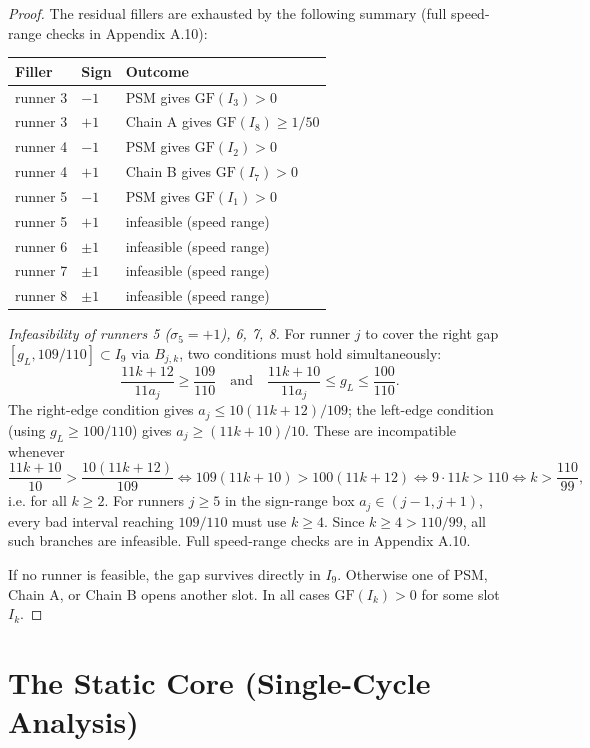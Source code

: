 \documentclass[12pt]{article}
\begin{document}
\begin{proof}
The residual fillers are exhausted by the following summary (full speed-range checks in
Appendix A.10):

\begin{center}
\begin{tabular}{@{}lll@{}}
\toprule
Filler & Sign & Outcome \\
\midrule
runner 3 & $-1$ & PSM gives $\mathrm{GF}(I_3)>0$ \\
runner 3 & $+1$ & Chain A gives $\mathrm{GF}(I_8)\ge 1/50$ \\
runner 4 & $-1$ & PSM gives $\mathrm{GF}(I_2)>0$ \\
runner 4 & $+1$ & Chain B gives $\mathrm{GF}(I_7)>0$ \\
runner 5 & $-1$ & PSM gives $\mathrm{GF}(I_1)>0$ \\
runner 5 & $+1$ & infeasible (speed range) \\
runner 6 & $\pm1$ & infeasible (speed range) \\
runner 7 & $\pm1$ & infeasible (speed range) \\
runner 8 & $\pm1$ & infeasible (speed range) \\
\bottomrule
\end{tabular}
\end{center}

\emph{Infeasibility of runners 5 ($\sigma_5=+1$), 6, 7, 8.} For runner $j$ to cover
the right gap $[g_L,109/110]\subset I_9$ via $B_{j,k}$, two conditions must hold
simultaneously:
\[
\frac{11k+12}{11a_j}\ge\frac{109}{110}\quad\text{and}\quad
  \frac{11k+10}{11a_j}\le g_L \le \frac{100}{110}.
\]
The right-edge condition gives $a_j\le 10(11k+12)/109$; the left-edge condition (using
$g_L\ge 100/110$) gives $a_j\ge(11k+10)/10$. These are incompatible whenever
\[
\frac{11k+10}{10} > \frac{10(11k+12)}{109}
  \iff 109(11k+10)>100(11k+12)
  \iff 9\cdot 11k > 110
  \iff k > \frac{110}{99},
\]
i.e. for all $k\ge 2$. For runners $j\ge 5$ in the sign-range box
$a_j\in(j-1,j+1)$, every bad interval reaching $109/110$ must use $k\ge 4$.
Since $k\ge 4>110/99$, all such branches are infeasible. Full speed-range checks are in
Appendix A.10.

If no runner is feasible, the gap survives directly in $I_9$. Otherwise one of PSM,
Chain A, or Chain B opens another slot. In all cases $\mathrm{GF}(I_k)>0$ for some
slot $I_k$.
\end{proof}



\section{The Static Core (Single-Cycle Analysis)}
\end{document}
